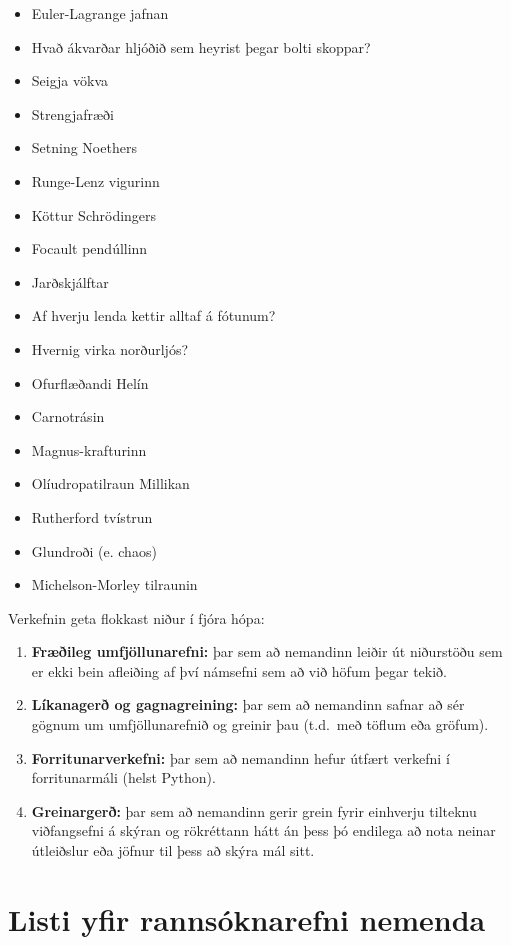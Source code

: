 \begin{multicols}{3}
\begin{itemize}
    \item Euler-Lagrange jafnan
    \item Hvað ákvarðar hljóðið sem heyrist þegar bolti skoppar?
    \item Seigja vökva
    \item Strengjafræði
    \item Setning Noethers
    \item Runge-Lenz vigurinn
    \item Köttur Schrödingers
    \item Focault pendúllinn
    \item Jarðskjálftar
    \item Af hverju lenda kettir alltaf á fótunum?
    \item Hvernig virka norðurljós?
    \item Ofurflæðandi Helín
    \item Carnotrásin
    \item Magnus-krafturinn
    \item Olíudropatilraun Millikan
    \item Rutherford tvístrun
    \item Glundroði (e. chaos)
    \item Michelson-Morley tilraunin
\end{itemize}
\end{multicols}

Verkefnin geta flokkast niður í fjóra hópa:

\begin{enumerate}[label = \textbf{(\roman*)}]
    \item \textbf{Fræðileg umfjöllunarefni:} þar sem að nemandinn leiðir út niðurstöðu sem er ekki bein afleiðing af því námsefni sem að við höfum þegar tekið.
    \item \textbf{Líkanagerð og gagnagreining:} þar sem að nemandinn safnar að sér gögnum um umfjöllunarefnið og greinir þau (t.d.~með töflum eða gröfum).
    \item \textbf{Forritunarverkefni:} þar sem að nemandinn hefur útfært verkefni í forritunarmáli (helst Python). 
    \item \textbf{Greinargerð:} þar sem að nemandinn gerir grein fyrir einhverju tilteknu viðfangsefni á skýran og rökréttann hátt án þess þó endilega að nota neinar útleiðslur eða jöfnur til þess að skýra mál sitt.
\end{enumerate}


\newpage

\section*{Listi yfir rannsóknarefni nemenda}

